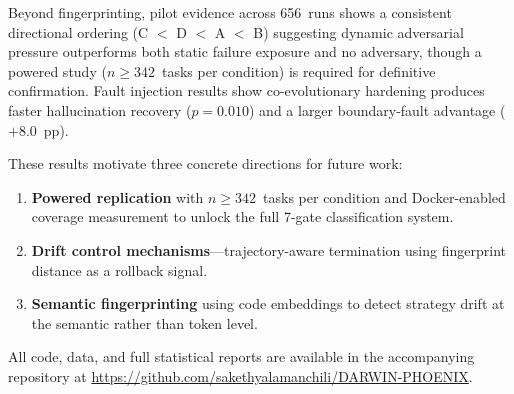 \documentclass[11pt,letterpaper]{article}
\begin{document}
Beyond fingerprinting, pilot evidence across 656~runs shows a consistent
directional ordering (C $<$ D $<$ A $<$ B) suggesting dynamic adversarial
pressure outperforms both static failure exposure and no adversary, though a
powered study ($n \geq 342$~tasks per condition) is required for definitive
confirmation. Fault injection results show co-evolutionary hardening produces
faster hallucination recovery ($p = 0.010$) and a larger boundary-fault
advantage ($+8.0$~pp).

These results motivate three concrete directions for future work:
\begin{enumerate}
  \item \textbf{Powered replication} with $n \geq 342$~tasks per condition and
        Docker-enabled coverage measurement to unlock the full 7-gate
        classification system.
  \item \textbf{Drift control mechanisms}---trajectory-aware termination using
        fingerprint distance as a rollback signal.
  \item \textbf{Semantic fingerprinting} using code embeddings to detect strategy
        drift at the semantic rather than token level.
\end{enumerate}

All code, data, and full statistical reports are available in the accompanying
repository at \url{https://github.com/sakethyalamanchili/DARWIN-PHOENIX}.
\end{document}
